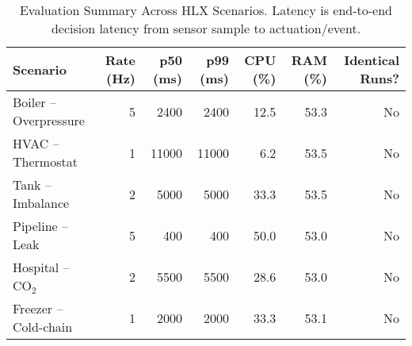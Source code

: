 \begin{table}[t]
\centering
\caption{Evaluation Summary Across HLX Scenarios. Latency is end-to-end decision latency from sensor sample to actuation/event.}
\label{tab:evaluation}
\begin{tabular}{lrrrrrr}
\hline
\textbf{Scenario} & \textbf{Rate (Hz)} & \textbf{p50 (ms)} & \textbf{p99 (ms)} & \textbf{CPU (\%)} & \textbf{RAM (\%)} & \textbf{Identical Runs?} \\
\hline
Boiler -- Overpressure & 5 & 2400 & 2400 & 12.5 & 53.3 & No \\
HVAC -- Thermostat     & 1 & 11000 & 11000 & 6.2 & 53.5 & No \\
Tank -- Imbalance      & 2 & 5000 & 5000 & 33.3 & 53.5 & No \\
Pipeline -- Leak       & 5 & 400 & 400 & 50.0 & 53.0 & No \\
Hospital -- CO$_2$     & 2 & 5500 & 5500 & 28.6 & 53.0 & No \\
Freezer -- Cold-chain  & 1 & 2000 & 2000 & 33.3 & 53.1 & No \\
\hline
\end{tabular}
\end{table}
